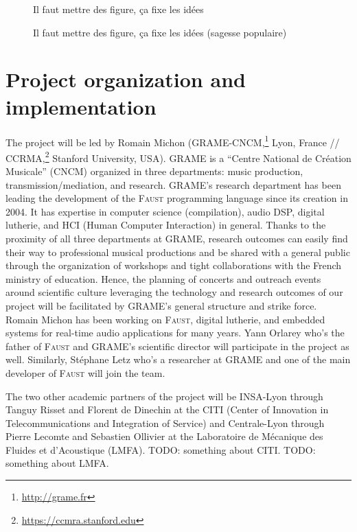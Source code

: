 \documentclass[a4paper,10pt]{article}
\newcommand{\F}{\textsc{Faust}}
\newcommand{\PP}{our project}
\begin{document}

\begin{figure}[h]
  \centerline{Il faut mettre des figure, ça fixe les idées}
    \caption{Il faut mettre des figure, ça fixe les idées (sagesse populaire)}
\label{fig1}
\end{figure}

\section*{Project organization and implementation}

The project will be led by Romain Michon (GRAME-CNCM,\footnote{\url{http://grame.fr}} Lyon, France // CCRMA,\footnote{\url{https://ccmra.stanford.edu}} Stanford University, USA). GRAME is a ``Centre National de Création Musicale'' (CNCM) organized in three departments: music production, transmission/mediation, and research. GRAME's research department has been leading the development of the \F{} programming language since its creation in 2004. It has expertise in computer science (compilation), audio DSP, digital lutherie, and HCI (Human Computer Interaction) in general. Thanks to the proximity of all three departments at GRAME, research outcomes can easily find their way to professional musical productions and be shared with a general public through the organization of workshops and tight collaborations with the French ministry of education. Hence, the planning of concerts and outreach events around scientific culture leveraging the technology and research outcomes of \PP{} will be facilitated by GRAME's general structure and strike force. Romain Michon has been working on \F{}, digital lutherie, and embedded systems for real-time audio applications for many years. Yann Orlarey who's the father of \F{} and GRAME's scientific director will participate in the project as well. Similarly, Stéphane Letz who's a researcher at GRAME and one of the main developer of \F{} will join the team. 

The two other academic partners of the project will be INSA-Lyon through Tanguy Risset and Florent de Dinechin at the CITI (Center of Innovation in Telecommunications and Integration of Service) and Centrale-Lyon through Pierre Lecomte and Sebastien Ollivier at the Laboratoire de Mécanique des Fluides et d'Acoustique (LMFA). TODO: something about CITI. TODO: something about LMFA.
\end{document}
